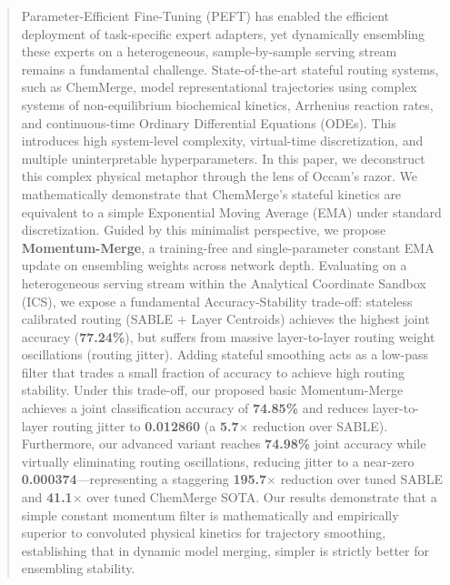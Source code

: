 \begin{abstract}
Parameter-Efficient Fine-Tuning (PEFT) has enabled the efficient deployment of task-specific expert adapters, yet dynamically ensembling these experts on a heterogeneous, sample-by-sample serving stream remains a fundamental challenge. State-of-the-art stateful routing systems, such as ChemMerge, model representational trajectories using complex systems of non-equilibrium biochemical kinetics, Arrhenius reaction rates, and continuous-time Ordinary Differential Equations (ODEs). This introduces high system-level complexity, virtual-time discretization, and multiple uninterpretable hyperparameters. In this paper, we deconstruct this complex physical metaphor through the lens of Occam's razor. We mathematically demonstrate that ChemMerge's stateful kinetics are equivalent to a simple Exponential Moving Average (EMA) under standard discretization. Guided by this minimalist perspective, we propose \textbf{Momentum-Merge}, a training-free and single-parameter constant EMA update on ensembling weights across network depth. Evaluating on a heterogeneous serving stream within the Analytical Coordinate Sandbox (ICS), we expose a fundamental Accuracy-Stability trade-off: stateless calibrated routing (SABLE + Layer Centroids) achieves the highest joint accuracy (\textbf{77.24\%}), but suffers from massive layer-to-layer routing weight oscillations (routing jitter). Adding stateful smoothing acts as a low-pass filter that trades a small fraction of accuracy to achieve high routing stability. Under this trade-off, our proposed basic Momentum-Merge achieves a joint classification accuracy of \textbf{74.85\%} and reduces layer-to-layer routing jitter to \textbf{0.012860} (a \textbf{5.7$\times$} reduction over SABLE). Furthermore, our advanced variant reaches \textbf{74.98\%} joint accuracy while virtually eliminating routing oscillations, reducing jitter to a near-zero \textbf{0.000374}---representing a staggering \textbf{195.7$\times$} reduction over tuned SABLE and \textbf{41.1$\times$} over tuned ChemMerge SOTA. Our results demonstrate that a simple constant momentum filter is mathematically and empirically superior to convoluted physical kinetics for trajectory smoothing, establishing that in dynamic model merging, simpler is strictly better for ensembling stability.
\end{abstract}
